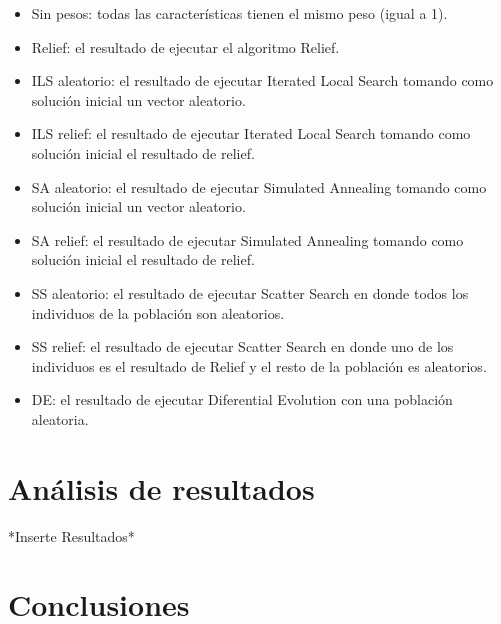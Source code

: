 \documentclass{ci5652}
\begin{document}
\begin{itemize}
  \item Sin pesos: todas las características tienen el mismo peso (igual a 1).
  \item Relief: el resultado de ejecutar el algoritmo Relief.
  \item ILS aleatorio: el resultado de ejecutar Iterated Local Search tomando 
  como solución inicial un vector aleatorio.
  \item ILS relief: el resultado de ejecutar Iterated Local Search tomando como
  solución inicial el resultado de relief.
  \item SA aleatorio: el resultado de ejecutar Simulated Annealing tomando como
  solución inicial un vector aleatorio.
  \item SA relief: el resultado de ejecutar Simulated Annealing tomando como
  solución inicial el resultado de relief.
  \item SS aleatorio: el resultado de ejecutar Scatter Search en donde todos los
  individuos de la población son aleatorios.
  \item SS relief: el resultado de ejecutar Scatter Search en donde uno de los
  individuos es el resultado de Relief y el resto de la población es aleatorios.
  \item DE: el resultado de ejecutar Diferential Evolution con una población
  aleatoria.
\end{itemize}


\section{Análisis de resultados}
*Inserte Resultados*\\

\section*{Conclusiones}

\end{document}
